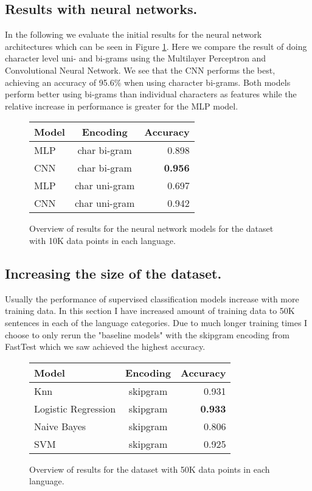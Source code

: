 \subsection{Results with neural networks.}
In the following we evaluate the initial results for the neural network architectures which can be seen in Figure \ref{keras-results}. Here we compare the result of doing character level uni- and bi-grams using the Multilayer Perceptron and Convolutional Neural Network. We see that the CNN performs the best, achieving an accuracy of 95.6\% when using character bi-grams. Both models perform better using bi-grams than individual characters as features while the relative increase in performance is greater for the MLP model.

\begin{figure}[h!]
  \centering
  \begin{tabular}{ l | c | r }
    \hline
    Model               & Encoding  & Accuracy \\
    \hline
    MLP                 & char bi-gram &  0.898 \\
    CNN                 & char bi-gram & \textbf{0.956} \\
    MLP                 & char uni-gram &  0.697\\
    CNN                 & char uni-gram  & 0.942 \\
    \hline
  \end{tabular}
  \caption{Overview of results for the neural network models for the dataset with 10K data points in each language.}
  \label{keras-results}
\end{figure}


\subsection{Increasing the size of the dataset.}
Usually the performance of supervised classification models increase with more training data. In this section I have increased amount of training data to 50K sentences in each of the language categories. Due to much longer training times I choose to only rerun the "baseline models" with the skipgram encoding from FastTest which we saw achieved the highest accuracy.

\begin{figure}[h!]
  \centering
  \begin{tabular}{ l  c | r }
    \hline
    Model               & Encoding & Accuracy \\
    \hline
    Knn                 & skipgram & 0.931\\
    Logistic Regression & skipgram  & \textbf{0.933}\\
    Naive Bayes         & skipgram  & 0.806\\
    SVM                 & skipgram& 0.925\\
    \hline
  \end{tabular}
  \caption{Overview of results for the dataset with 50K data points in each language.}
  \label{results-sklearn300k}
\end{figure}

